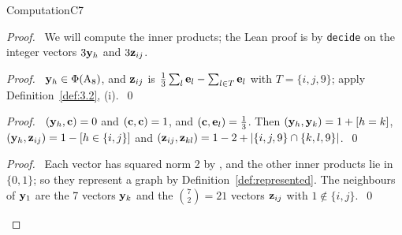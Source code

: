 \begin{namedresult}{Computation}{C7}\label{comp:C7}
\end{namedresult}
\begin{proof}
 \pfsketch\ We will compute the inner products; the Lean proof is by \texttt{decide} on the
 integer vectors $3{\mathbf y}_h$ and $3{\mathbf z}_{ij}$.
 \begin{proof}\pf\ ${\mathbf y}_h\in\Phi(\mathrm{A}_8)$, and ${\mathbf z}_{ij}$ is
  $\frac13\sum_l{\mathbf e}_l-\sum_{l\in T}{\mathbf e}_l$ with $T=\{i,j,9\}$; apply
  Definition~\ref{def:3.2}, (i).~\qed\end{proof}
 \begin{proof}\pf\ $({\mathbf y}_h,{\mathbf c})=0$ and $({\mathbf c},{\mathbf c})=1$, and $({\mathbf c},{\mathbf e}_l)=\frac13$. Then
  $({\mathbf y}_h,{\mathbf y}_k)=1+[h=k]$, $({\mathbf y}_h,{\mathbf z}_{ij})=1-[h\in\{i,j\}]$ and
  $({\mathbf z}_{ij},{\mathbf z}_{kl})=1-2+|\{i,j,9\}\cap\{k,l,9\}|$.~\qed\end{proof}
 \qedstep
 \begin{proof}\pf\ Each vector has squared norm 2 by , and the other inner
  products lie in $\{0,1\}$; so they represent a graph by Definition~\ref{def:represented}. The
  neighbours of ${\mathbf y}_1$ are the 7 vectors ${\mathbf y}_k$ and the $\binom72=21$ vectors ${\mathbf z}_{ij}$ with
  $1\notin\{i,j\}$.~\qed\end{proof}
\end{proof}

